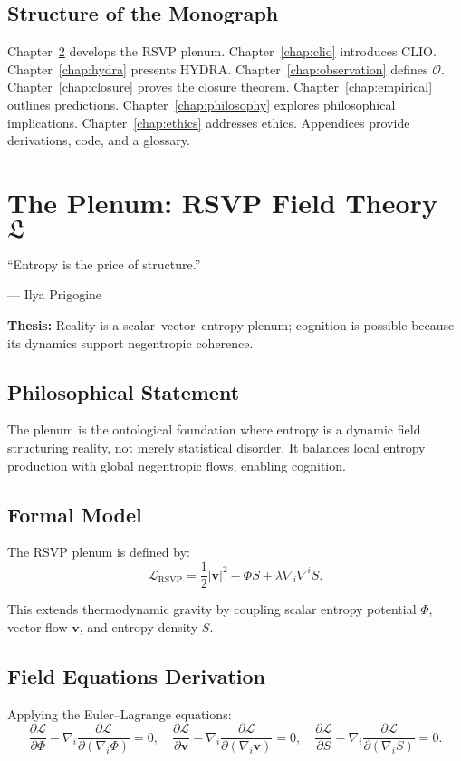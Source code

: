 \documentclass[12pt]{book}
\theoremstyle{definition}
\begin{document}
\section{Structure of the Monograph}
\label{sec:structure}
Chapter~\ref{chap:plenum} develops the RSVP plenum. Chapter~\ref{chap:clio} introduces CLIO. Chapter~\ref{chap:hydra} presents HYDRA. Chapter~\ref{chap:observation} defines \(\mathcal{O}\). Chapter~\ref{chap:closure} proves the closure theorem. Chapter~\ref{chap:empirical} outlines predictions. Chapter~\ref{chap:philosophy} explores philosophical implications. Chapter~\ref{chap:ethics} addresses ethics. Appendices provide derivations, code, and a glossary.

\chapter{The Plenum: RSVP Field Theory \texorpdfstring{\(\mathfrak{L}\)}{L}}
\label{chap:plenum}
\epigraph{``Entropy is the price of structure.''}{--- Ilya Prigogine}

\textbf{Thesis:} Reality is a scalar–vector–entropy plenum; cognition is possible because its dynamics support negentropic coherence.

\section{Philosophical Statement}
The plenum is the ontological foundation where entropy is a dynamic field structuring reality, not merely statistical disorder. It balances local entropy production with global negentropic flows, enabling cognition.

\section{Formal Model}
The RSVP plenum is defined by:
\begin{equation}
\label{eq:rsvp_lagrangian}
\mathcal{L}_{\text{RSVP}} = \frac{1}{2}|\mathbf{v}|^2 - \Phi S + \lambda \nabla_i \nabla^i S.
\end{equation}

This extends thermodynamic gravity \cite{jacobson1995thermodynamics, gibbs2025entropic} by coupling scalar entropy potential \(\Phi\), vector flow \(\mathbf{v}\), and entropy density \(S\).

\section{Field Equations Derivation}
Applying the Euler–Lagrange equations:
\begin{equation}
\frac{\partial \mathcal{L}}{\partial \Phi} - \nabla_i \frac{\partial \mathcal{L}}{\partial (\nabla_i \Phi)} = 0, \quad
\frac{\partial \mathcal{L}}{\partial \mathbf{v}} - \nabla_i \frac{\partial \mathcal{L}}{\partial (\nabla_i \mathbf{v})} = 0, \quad
\frac{\partial \mathcal{L}}{\partial S} - \nabla_i \frac{\partial \mathcal{L}}{\partial (\nabla_i S)} = 0.
\end{equation}
\end{document}
